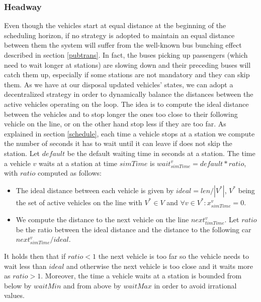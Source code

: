 \documentclass[12pt,a4paper]{article}
\begin{document}
\subsubsection{Headway}\label{hw}
Even though the vehicles start at equal distance at the beginning of the scheduling horizon, if no strategy is adopted to maintain an equal distance between them the system will suffer from the well-known bus bunching effect described in section \ref{pubtrans}. In fact, the buses picking up passengers (which need to wait longer at stations) are slowing down and their preceding buses will catch them up, especially if some stations are not mandatory and they can skip them. As we have at our disposal updated vehicles' states, we can adopt a decentralized strategy in order to dynamically balance the distances between the active vehicles operating on the loop. The idea is to compute the ideal distance between the vehicles and to stop longer the ones too close to their following vehicle on the line, or on the other hand stop less if they are too far. As explained in section \ref{schedule}, each time a vehicle stops at a station we compute the number of seconds it has to wait until it can leave if does not skip the station. Let $default$ be the default waiting time in seconds at a station. The time a vehicle $v$ waits at a station at time $simTime$ is $wait^{v}_{simTime} = default * ratio$, with $ratio$ computed as follows:
\begin{itemize}
\setlength\itemsep{1pt}
\item The ideal distance between each vehicle is given by $ideal = len / |V^{*}|$, $V^{*}$ being the set of active vehicles on the line with $V^{*}\in V$ and $\forall v \in V^{*}: x^{v}_{simTime} = 0$. 
\item We compute the distance to the next vehicle on the line $next^{v}_{timTime}$. Let $ratio$ be the ratio between the ideal distance and the distance to the following car $next^{v}_{simTime} / ideal$.
\end{itemize}
It holds then that if $ratio < 1$ the next vehicle is too far so the vehicle needs to wait less than $ideal$ and otherwise the next vehicle is too close and it waits more as $ratio >1$. Moreover, the time a vehicle waits at a station is bounded from below by $waitMin$ and from above by $waitMax$ in order to avoid irrational values.
\end{document}
